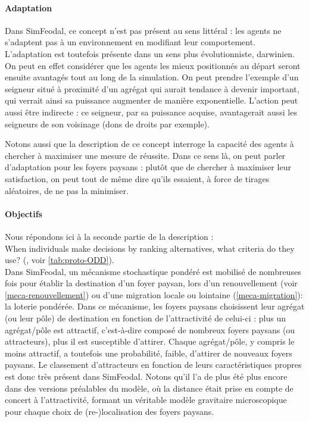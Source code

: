 \paragraph{Adaptation} Dans SimFeodal, ce concept n'est pas présent au sens littéral : les agents ne s'adaptent pas à un environnement en modifiant leur comportement.
L'adaptation est toutefois présente dans un sens plus évolutionniste, darwinien.
On peut en effet considérer que les agents les mieux positionnés au départ seront ensuite avantagés tout au long de la simulation.
On peut prendre l'exemple d'un seigneur situé à proximité d'un agrégat qui aurait tendance à devenir important, qui verrait ainsi sa puissance augmenter de manière exponentielle.
L'action peut aussi être indirecte : ce seigneur, par sa puissance acquise, avantagerait aussi les seigneurs de son voisinage (dons de droits par exemple).

Notons aussi que la description de ce concept interroge la capacité des agents à chercher à maximiser une mesure de réussite.
Dans ce sens là, on peut parler d'adaptation pour les foyers paysans : plutôt que de chercher à maximiser leur satisfaction, on peut tout de même dire qu'ils essaient, à force de tirages aléatoires, de ne pas la minimiser.


\paragraph{Objectifs} Nous répondons ici à la seconde partie de la description :\\
\og When individuals make decisions by ranking alternatives, what criteria do they use?\fg{} (\textcite{grimm_documenting_2017}, voir \cref{tab:proto-ODD}).\\
Dans SimFeodal, un mécanisme stochastique pondéré est mobilisé de nombreuses fois pour établir la destination d'un foyer paysan, lors d'un renouvellement (voir \cref{meca-renouvellement}) ou d'une migration locale ou lointaine (\cref{meca-migration}): la \og loterie pondérée\fg{}.
Dans ce mécanisme, les foyers paysans \og choisissent\fg{} leur agrégat (ou leur pôle) de destination en fonction de l'attractivité de celui-ci :
plus un agrégat/pôle est attractif, c'est-à-dire composé de nombreux foyers paysans (ou attracteurs), plus il est susceptible d'attirer.
Chaque agrégat/pôle, y compris le moins attractif, a toutefois une probabilité, faible, d'attirer de nouveaux foyers paysans.
Le classement d'attracteurs en fonction de leurs caractéristiques propres est donc très présent dans SimFeodal.
Notons qu'il l'a de plus été plus encore dans des versions préalables du modèle, où la distance était prise en compte de concert à l'attractivité, formant un véritable modèle gravitaire microscopique pour chaque choix de (re-)localisation des foyers paysans.

